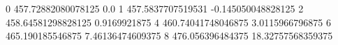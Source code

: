 0 457.72882080078125 0.0
1 457.5837707519531 -0.145050048828125
2 458.64581298828125 0.9169921875
4 460.74041748046875 3.0115966796875
6 465.190185546875 7.46136474609375
8 476.056396484375 18.32757568359375
